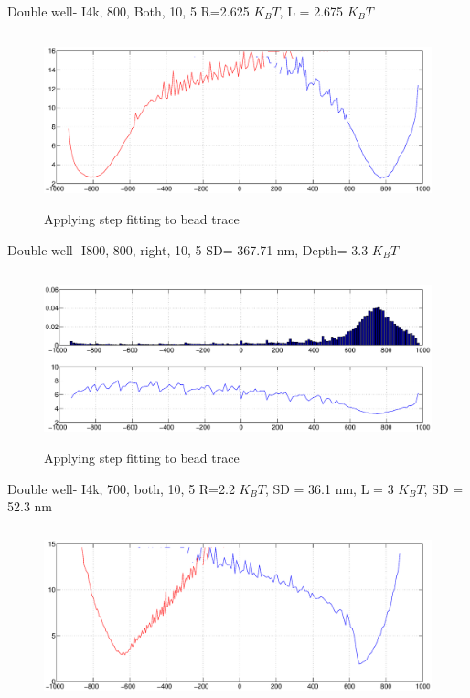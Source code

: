 \documentclass{beamer}
\begin{document}
\begin{frame}{Double well- I4k, 800, Both, 10, 5} 
R=2.625 $K_BT$, L = 2.675 $K_BT$ 
\begin{figure}
    \centering
    \includegraphics[height=5cm,width=12cm]{both_wells_800_I4k.eps}
    \caption{Applying step fitting to bead trace}
    \label{fig:graph3}
\end{figure}


\end{frame}

\begin{frame}{Double well- I800, 800, right, 10, 5} 
SD= 367.71 nm, Depth= 3.3 $K_BT$ 
\begin{figure}
    \centering
    \includegraphics[height=5cm,width=12cm]{right_well_I800_800.eps}
    \caption{Applying step fitting to bead trace}
    \label{fig:graph4}
\end{figure}


\end{frame}



\begin{frame}{Double well- I4k, 700, both, 10, 5} 
R=2.2 $K_BT$, SD = 36.1 nm, L = 3 $K_BT$, SD = 52.3 nm 
\begin{figure}
    \centering
    \includegraphics[height=5cm,width=12cm]{both_wells_I4k_700.eps}
    \label{fig:graph5}
\end{figure}


\end{frame}
\end{document}
